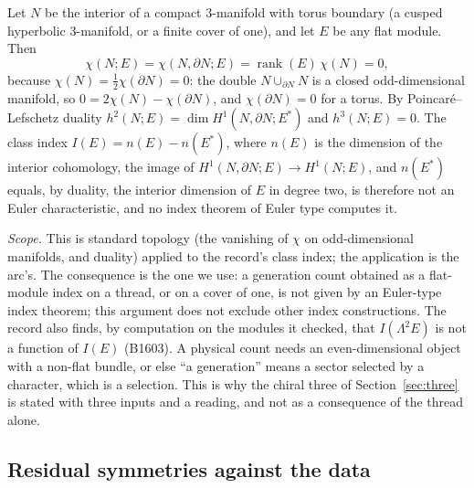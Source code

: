 \begin{lemma}[N1; B1604]\label{bd:noindex}
Let $N$ be the interior of a compact $3$-manifold with torus boundary (a cusped hyperbolic $3$-manifold, or a finite
cover of one), and let $E$ be any flat module. Then
\[
  \chi(N;E)=\chi(N,\partial N;E)=\operatorname{rank}(E)\,\chi(N)=0,
\]
because $\chi(N)=\tfrac12\chi(\partial N)=0$: the double $N\cup_{\partial N}N$ is a closed odd-dimensional manifold, so
$0=2\chi(N)-\chi(\partial N)$, and $\chi(\partial N)=0$ for a torus. By Poincar\'e--Lefschetz duality $h^2(N;E)=\dim H^1(N,\partial N;E^*)$ and
$h^3(N;E)=0$. The class index $I(E)=n(E)-n(E^*)$, where $n(E)$ is the dimension of the interior cohomology, the image of
$H^1(N,\partial N;E)\to H^1(N;E)$, and $n(E^*)$ equals, by duality, the interior dimension of $E$ in degree two, is therefore not an Euler characteristic, and no
index theorem of Euler type computes it.
\end{lemma}

\emph{Scope.} This is standard topology (the vanishing of $\chi$ on odd-dimensional manifolds, and duality) applied to
the record's class index; the application is the arc's. The consequence is the one we use: a generation count obtained
as a flat-module index on a thread, or on a cover of one, is not given by an Euler-type index theorem; this argument does not exclude other index constructions. The
record also finds, by computation on the modules it checked, that $I(\Lambda^2E)$ is not a function of $I(E)$ (B1603). A
physical count needs an even-dimensional object with a non-flat bundle, or else ``a generation'' means a sector
selected by a character, which is a selection. This is why the chiral three of Section~\ref{sec:three} is stated with
three inputs and a reading, and not as a consequence of the thread alone.

\subsection{Residual symmetries against the data}

